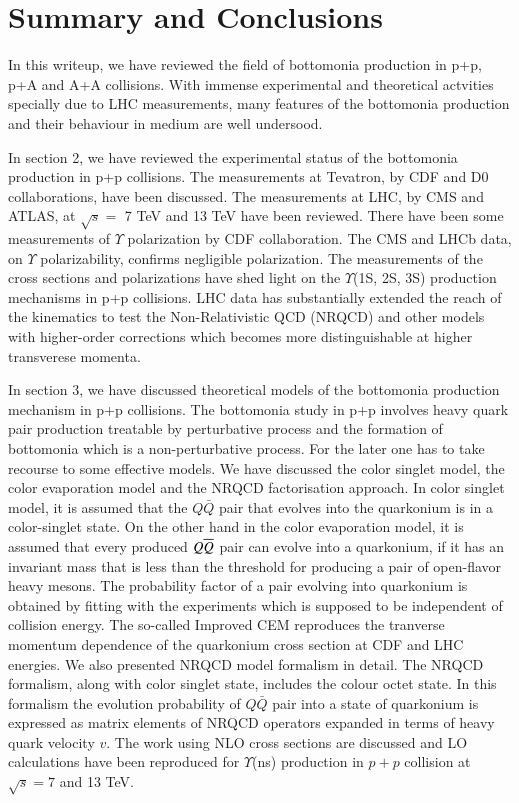 \section{Summary and Conclusions}
\label{sec:conclusions}
In this writeup, we have reviewed the field of bottomonia production in
p+p, p+A and A+A collisions. With immense experimental and theoretical actvities
specially due to LHC measurements, many features of the bottomonia production
and their behaviour in medium are well undersood.

In section 2, we have reviewed the experimental status of the bottomonia production
in p+p collisions. The measurements at Tevatron, by CDF and D0 collaborations,
have been discussed. The measurements at LHC, by CMS and ATLAS, at ${\sqrt s}=$ 7 TeV and
13 TeV have been reviewed. There have been some measurements 
of $\Upsilon$ polarization by CDF collaboration.
The CMS and LHCb data, on $\Upsilon$ polarizability, confirms 
negligible polarization. 
The measurements of the cross sections and polarizations have shed light on the
$\Upsilon$(1S, 2S, 3S) production mechanisms in p+p collisions.
LHC data has substantially extended the reach of the kinematics to test the
Non-Relativistic QCD (NRQCD) and other models with 
higher-order corrections which becomes more
distinguishable at higher transverese momenta.


In section 3, we have discussed theoretical models of the bottomonia production
mechanism in p+p collisions. The bottomonia study in p+p involves heavy quark
pair production treatable by perturbative process and the formation of bottomonia 
which is a non-perturbative process.
For the later one has to take recourse to some effective models. We have discussed the 
color singlet model, the color evaporation model and the NRQCD factorisation approach.
In color singlet model, it is assumed that the $Q\bar Q$ pair that evolves into
the quarkonium is in a color-singlet state. 
On the other hand in the color evaporation model,
it is assumed that every produced $Q \overline{Q}$ pair can evolve into a quarkonium,
if it has an invariant mass that is less than the threshold for
producing a pair of open-flavor heavy mesons.
The probability factor of a pair evolving into quarkonium is obtained by fitting with
the experiments which is supposed to be independent of collision energy. 
The so-called Improved CEM reproduces the tranverse momentum dependence of the
quarkonium cross section at CDF and LHC energies.  
We also presented NRQCD model formalism in detail.
The NRQCD formalism, along with color singlet state, includes the colour octet state.
In this formalism the evolution probability of $Q\bar{Q}$
pair into a state of quarkonium is expressed as matrix elements of NRQCD operators
expanded in terms of heavy quark velocity $v$.
The work using NLO cross sections are discussed and LO calculations have been
reproduced for $\Upsilon$(ns)
production in $p+p$ collision at $\sqrt s = 7$ and 13 TeV.

